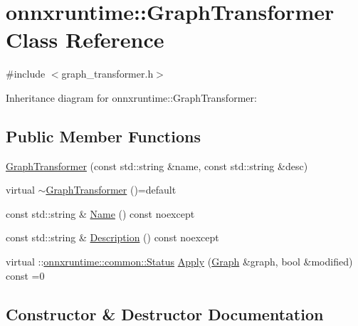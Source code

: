 \hypertarget{classonnxruntime_1_1GraphTransformer}{}\section{onnxruntime\+:\+:Graph\+Transformer Class Reference}
\label{classonnxruntime_1_1GraphTransformer}


{\ttfamily \#include $<$graph\+\_\+transformer.\+h$>$}



Inheritance diagram for onnxruntime\+:\+:Graph\+Transformer\+:
\subsection*{Public Member Functions}
\begin{DoxyCompactItemize}
\item 
\mbox{\hyperlink{classonnxruntime_1_1GraphTransformer_a14aabd7b57a4a7bad158c3bc17e7b43a}{Graph\+Transformer}} (const std\+::string \&name, const std\+::string \&desc)
\item 
virtual \mbox{\hyperlink{classonnxruntime_1_1GraphTransformer_a17d436d4bb632f9a1d30b469946dd7ab}{$\sim$\+Graph\+Transformer}} ()=default
\item 
const std\+::string \& \mbox{\hyperlink{classonnxruntime_1_1GraphTransformer_a280e21558a88f2a9b262d41b4a3d2e96}{Name}} () const noexcept
\item 
const std\+::string \& \mbox{\hyperlink{classonnxruntime_1_1GraphTransformer_a277d37c8cd3de6208f5a1d76b6e16689}{Description}} () const noexcept
\item 
virtual \+::\mbox{\hyperlink{classonnxruntime_1_1common_1_1Status}{onnxruntime\+::common\+::\+Status}} \mbox{\hyperlink{classonnxruntime_1_1GraphTransformer_a690d351da797884409b1d7aa584e33b5}{Apply}} (\mbox{\hyperlink{classonnxruntime_1_1Graph}{Graph}} \&graph, bool \&modified) const =0
\end{DoxyCompactItemize}


\subsection{Constructor \& Destructor Documentation}
\mbox{\label{classonnxruntime_1_1GraphTransformer_a14aabd7b57a4a7bad158c3bc17e7b43a}} 

